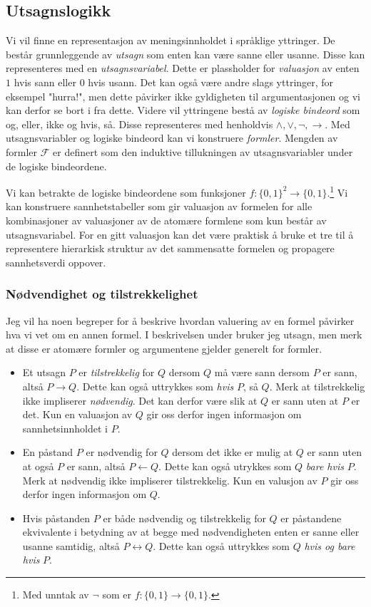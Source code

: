 \subsection{Utsagnslogikk}
Vi vil finne en representasjon av meningsinnholdet i språklige yttringer. De består grunnleggende av \textit{utsagn} som enten kan være sanne eller usanne. Disse kan representeres med en \textit{utsagnsvariabel}. Dette er plassholder for \textit{valuasjon} av enten $1$ hvis sann eller $0$ hvis usann. Det kan også være andre slags yttringer, for eksempel "hurra!", men dette påvirker ikke gyldigheten til argumentasjonen og vi kan derfor se bort i fra dette. Videre vil yttringene bestå av \textit{logiske bindeord} som og, eller, ikke og hvis, så. Disse representeres med henholdvis $\land, \lor, \neg, \rightarrow$. Med utsagnsvariabler og logiske bindeord kan vi konstruere \textit{formler}. Mengden av formler $\mathcal{F}$ er definert som den induktive tillukningen av utsagnsvariabler under de logiske bindeordene. 

Vi kan betrakte de logiske bindeordene som funksjoner $f:\{0,1\}^2\to\{0,1\}$.\footnote{Med unntak av $\neg$ som er $f:\{0,1\}\to\{0,1\}$.} Vi kan konstruere sannhetstabeller som gir valuasjon av formelen for alle kombinasjoner av valuasjoner av de atomære formlene som kun består av utsagnsvariabel. For en gitt valuasjon kan det være praktisk å bruke et tre til å representere hierarkisk struktur av det sammensatte formelen og propagere sannhetsverdi oppover.
\subsubsection{Nødvendighet og tilstrekkelighet}
Jeg vil ha noen begreper for å beskrive hvordan valuering av en formel påvirker hva vi vet om en annen formel. I beskrivelsen under bruker jeg utsagn, men merk at disse er atomære formler og argumentene gjelder generelt for formler.
\begin{itemize}
\item Et utsagn $P$ er \textit{tilstrekkelig} for $Q$ dersom $Q$ må være sann dersom $P$ er sann, altså $P \rightarrow Q$. Dette kan også uttrykkes som \textit{hvis} $P$, så $Q$. Merk at tilstrekkelig ikke impliserer \textit{nødvendig}. Det kan derfor være slik at $Q$ er sann uten at $P$ er det. Kun en valuasjon av $Q$ gir oss derfor ingen informasjon om sannhetsinnholdet i $P$.
\item En påstand $P$ er nødvendig for $Q$ dersom det ikke er mulig at $Q$ er sann uten at også $P$ er sann, altså $P \leftarrow Q$. Dette kan også utrykkes som $Q$ \textit{bare hvis} $P$. Merk at nødvendig ikke impliserer tilstrekkelig. Kun en valusjon av $P$ gir oss derfor ingen informasjon om $Q$.
\item Hvis påstanden $P$ er både nødvendig og tilstrekkelig for $Q$ er påstandene ekvivalente i betydning av at begge med nødvendigheten enten er sanne eller usanne samtidig, altså $P \leftrightarrow Q$. Dette kan også uttrykkes som $Q$ \textit{hvis og bare hvis} $P$. 
\end{itemize}
